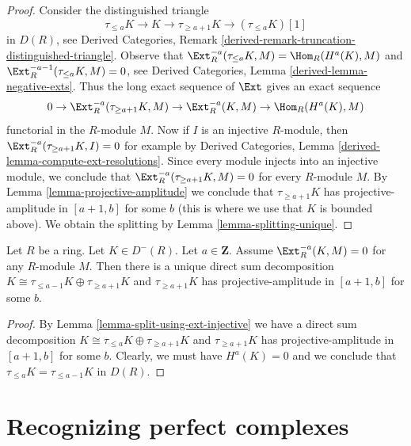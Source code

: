 \begin{proof}
Consider the distinguished triangle
$$
\tau_{\leq a}K \to K \to \tau_{\geq a + 1}K \to (\tau_{\leq a}K)[1]
$$
in $D(R)$, see Derived Categories, Remark
\ref{derived-remark-truncation-distinguished-triangle}.
Observe that
$\Ext^{-a}_R(\tau_{\leq a}K, M) = \Hom_R(H^a(K), M)$
and
$\Ext^{-a - 1}_R(\tau_{\leq a}K, M) = 0$, see
Derived Categories, Lemma \ref{derived-lemma-negative-exts}. Thus
the long exact sequence of $\Ext$ gives an exact sequence
$$
0 \to
\Ext^{-a}_R(\tau_{\geq a + 1}K, M) \to
\Ext^{-a}_R(K, M) \to
\Hom_R(H^a(K), M)
$$
functorial in the $R$-module $M$.
Now if $I$ is an injective $R$-module, then
$\Ext^{-a}_R(\tau_{\geq a + 1}K, I) = 0$ for example by
Derived Categories, Lemma \ref{derived-lemma-compute-ext-resolutions}.
Since every module injects into an injective module,
we conclude that $\Ext^{-a}_R(\tau_{\geq a + 1}K, M) = 0$
for every $R$-module $M$. By Lemma \ref{lemma-projective-amplitude}
we conclude that $\tau_{\geq a + 1}K$ has projective-amplitude
in $[a + 1, b]$ for some $b$ (this is where we use that $K$
is bounded above). We obtain the splitting by
Lemma \ref{lemma-splitting-unique}.
\end{proof}

\begin{lemma}
\label{lemma-split-using-ext-zero}
Let $R$ be a ring. Let $K \in D^-(R)$. Let $a \in \mathbf{Z}$.
Assume $\Ext^{-a}_R(K, M) = 0$ for any $R$-module $M$.
Then there is a unique direct sum decomposition
$K \cong \tau_{\leq a - 1}K \oplus \tau_{\geq a + 1}K$
and $\tau_{\geq a + 1}K$ has projective-amplitude in $[a + 1, b]$
for some $b$.
\end{lemma}

\begin{proof}
By Lemma \ref{lemma-split-using-ext-injective}
we have a direct sum decomposition
$K \cong \tau_{\leq a}K \oplus \tau_{\geq a + 1}K$
and $\tau_{\geq a + 1}K$ has projective-amplitude in $[a + 1, b]$
for some $b$. Clearly, we must have $H^a(K) = 0$ and
we conclude that $\tau_{\leq a}K = \tau_{\leq a - 1}K$
in $D(R)$.
\end{proof}














\section{Recognizing perfect complexes}
\label{section-recognizing-perfect}

